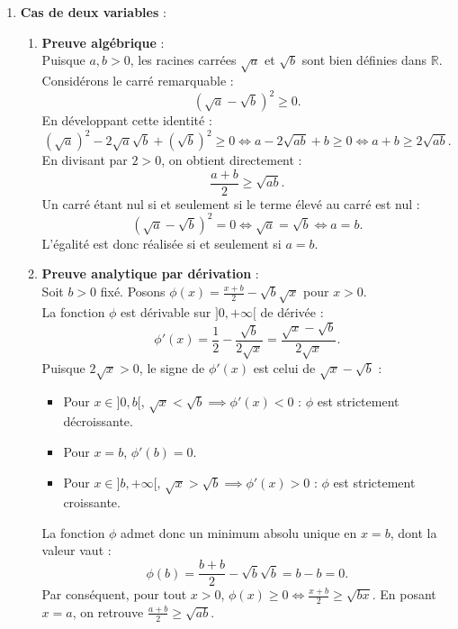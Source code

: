 \documentclass[11pt,a4paper]{article}
\newcommand{\R}{\mathbb{R}}
\begin{document}
\begin{correctionbox}
\begin{enumerate}[label=\textbf{\arabic*.}]
    \item \textbf{Cas de deux variables} :
    \begin{enumerate}[label=\alph*.]
        \item \textbf{Preuve algébrique} :\\
        Puisque $a, b > 0$, les racines carrées $\sqrt{a}$ et $\sqrt{b}$ sont bien définies dans $\R$.
        Considérons le carré remarquable :
        \[
        (\sqrt{a} - \sqrt{b})^2 \ge 0.
        \]
        En développant cette identité :
        \[
        (\sqrt{a})^2 - 2\sqrt{a}\sqrt{b} + (\sqrt{b})^2 \ge 0 \iff a - 2\sqrt{ab} + b \ge 0 \iff a + b \ge 2\sqrt{ab}.
        \]
        En divisant par $2 > 0$, on obtient directement :
        \[
        \frac{a+b}{2} \ge \sqrt{ab}.
        \]
        Un carré étant nul si et seulement si le terme élevé au carré est nul :
        \[
        (\sqrt{a} - \sqrt{b})^2 = 0 \iff \sqrt{a} = \sqrt{b} \iff a = b.
        \]
        L'égalité est donc réalisée si et seulement si $a = b$.

        \item \textbf{Preuve analytique par dérivation} :\\
        Soit $b > 0$ fixé. Posons $\phi(x) = \frac{x+b}{2} - \sqrt{b}\sqrt{x}$ pour $x > 0$.\\
        La fonction $\phi$ est dérivable sur $]0, +\infty[$ de dérivée :
        \[
        \phi'(x) = \frac{1}{2} - \frac{\sqrt{b}}{2\sqrt{x}} = \frac{\sqrt{x} - \sqrt{b}}{2\sqrt{x}}.
        \]
        Puisque $2\sqrt{x} > 0$, le signe de $\phi'(x)$ est celui de $\sqrt{x} - \sqrt{b}$ :
        \begin{itemize}
            \item Pour $x \in ]0, b[$, $\sqrt{x} < \sqrt{b} \implies \phi'(x) < 0$ : $\phi$ est strictement décroissante.
            \item Pour $x = b$, $\phi'(b) = 0$.
            \item Pour $x \in ]b, +\infty[$, $\sqrt{x} > \sqrt{b} \implies \phi'(x) > 0$ : $\phi$ est strictement croissante.
        \end{itemize}
        La fonction $\phi$ admet donc un minimum absolu unique en $x = b$, dont la valeur vaut :
        \[
        \phi(b) = \frac{b+b}{2} - \sqrt{b}\sqrt{b} = b - b = 0.
        \]
        Par conséquent, pour tout $x > 0$, $\phi(x) \ge 0 \iff \frac{x+b}{2} \ge \sqrt{bx}$. En posant $x = a$, on retrouve $\frac{a+b}{2} \ge \sqrt{ab}$.
    \end{enumerate}


\end{enumerate}
\end{correctionbox}
\end{document}

